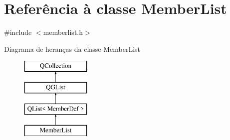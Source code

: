 \hypertarget{class_member_list}{\section{Referência à classe Member\-List}
\label{class_member_list}
}


{\ttfamily \#include $<$memberlist.\-h$>$}

Diagrama de heranças da classe Member\-List\begin{figure}[H]
\begin{center}
\leavevmode
\includegraphics[height=4.000000cm]{class_member_list}
\end{center}
\end{figure}
